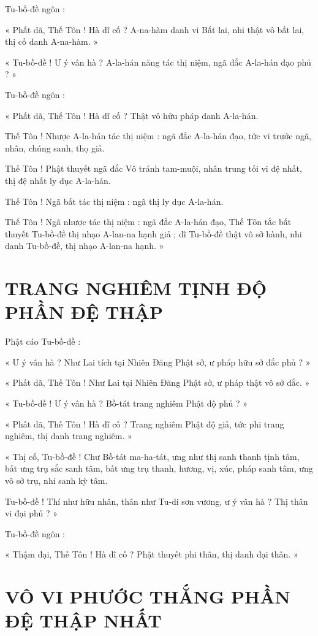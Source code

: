	Tu-bồ-đề ngôn :
	
	« Phất dã, Thế Tôn ! Hà dĩ cố ? A-na-hàm danh vi Bất lai, nhi thật vô bất lai, thị cố danh A-na-hàm. »
	
	« Tu-bồ-đề ! Ư ý vân hà ? A-la-hán năng tác thị niệm, ngã đắc A-la-hán đạo phủ ? »
	
	Tu-bồ-đề ngôn :
	
	« Phất dã, Thế Tôn ! Hà dĩ cố ? Thật vô hữu pháp danh A-la-hán. 
	
	Thế Tôn ! Nhược A-la-hán tác thị niệm : ngã đắc A-la-hán đạo, tức vi trước ngã, nhân, chúng sanh, thọ giả. 
	
	Thế Tôn ! Phật thuyết ngã đắc Vô tránh tam-muội, nhân trung tối vi đệ nhất, thị đệ nhất ly dục A-la-hán. 
	
	Thế Tôn ! Ngã bất tác thị niệm : ngã thị ly dục A-la-hán. 
	
	Thế Tôn ! Ngã nhược tác thị niệm : ngã đắc A-la-hán đạo, Thế Tôn tắc bất thuyết Tu-bồ-đề thị nhạo A-lan-na hạnh giả ; dĩ Tu-bồ-đề thật vô sở hành, nhi danh Tu-bồ-đề, thị nhạo A-lan-na hạnh. »
	
	\section*{TRANG NGHIÊM TỊNH ĐỘ PHẦN ĐỆ THẬP}
	
	Phật cáo Tu-bồ-đề :
	
	« Ư ý vân hà ? Như Lai tích tại Nhiên Đăng Phật sở, ư pháp hữu sở đắc phủ ? »
	
	« Phất dã, Thế Tôn ! Như Lai tại Nhiên Đăng Phật sở, ư pháp thật vô sở đắc. »
	
	« Tu-bồ-đề ! Ư ý vân hà ? Bồ-tát trang nghiêm Phật độ phủ ? »
	
	« Phất dã, Thế Tôn ! Hà dĩ cố ? Trang nghiêm Phật độ giả, tức phi trang nghiêm, thị danh trang nghiêm. »
	
	« Thị cố, Tu-bồ-đề ! Chư Bồ-tát ma-ha-tát, ưng như thị sanh thanh tịnh tâm, bất ưng trụ sắc sanh tâm, bất ưng trụ thanh, hương, vị, xúc, pháp sanh tâm, ưng vô sở trụ, nhi sanh kỳ tâm. 
	
	Tu-bồ-đề ! Thí như hữu nhân, thân như Tu-di sơn vương, ư ý vân hà ? Thị thân vi đại phủ ? »
	
	Tu-bồ-đề ngôn :
	
	« Thậm đại, Thế Tôn ! Hà dĩ cố ? Phật thuyết phi thân, thị danh đại thân. »
	
	\section*{VÔ VI PHƯỚC THẮNG PHẦN ĐỆ THẬP NHẤT}
	
